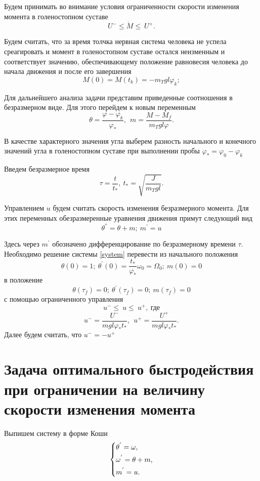 \documentclass[a4paper,14pt]{article}
\theoremstyle{plain} %
\theoremstyle{definition} %
\theoremstyle{remark} %
\begin{document}
{Будем принимать во внимание условия ограниченности скорости изменения
момента в голеностопном суставе
\[
    U^-\le\dot{M}\le\ U^+.
\]

Будем считать, что за время толчка нервная система человека
не успела среагировать и момент в голеностопном суставе остался
неизменным и соответствует значению, обеспечивающему положение
равновесия человека до начала движения и после его завершения
\[
    M(0)=M\left(t_k\right)=-m_Tgl\varphi_k;
\]

Для дальнейшего анализа задачи представим приведенные
соотношения в безразмерном виде. Для этого перейдем
к новым переменным
\[
    \theta=\frac{\varphi-\varphi_k}{\varphi_\ast},\ \ m=\frac{M-M_f}{m_Tgl\varphi}.
\]

В качестве характерного значения угла выберем разность
начального и конечного значений угла в голеностопном
суставе при выполнении пробы $\varphi_\ast=\varphi_0-\varphi_k$

Введем безразмерное время
\[
    \tau=\frac{t}{t_\ast},\ t_\ast=\sqrt{\frac{J}{m_Tgl}}.
\]

Управлением $u$ будем считать скорость изменения безразмерного
момента. Для этих переменных обезразмеренные уравнения движения
примут следующий вид
\begin{equation}\label{system}
    \theta^{''}=\theta+m;\ m^{'}=u
\end{equation}

Здесь через $m^{'}$ обозначено дифференцирование по
безразмерному времени $\tau$. Необходимо решение системы \eqref{system}
перевести из начального положения
\[
    \theta(0)=1;\ \theta^{'}(0)=\frac{t_\ast}{\varphi_\ast}\omega_0=\Omega_0;\ m(0)=0
\]
в положение
\[
    \theta(\tau_f)=0;\ \theta^{'}(\tau_f)=0;\ m(\tau_f)=0
\]
с помощью ограниченного управления
\[
    u^-\le\ u\le\ u^+,\ \text{где}
\]
\[
    u^-=\frac{U^-}{mgl\varphi_\ast t_\ast},\ \ u^+=\frac{U^+}{mgl\varphi_\ast t_\ast}.
\]
Далее будем считать, что $u^-=-u^+$
\newpage
\section{Задача оптимального быстродействия при ограничении на величину скорости изменения момента}
Выпишем систему в форме Коши
\begin{equation}\label{koshisystem}
    \left\{ {\begin{aligned}
                 & \theta^{'} = \omega , \hfill   \\
                 & \omega^{'} = \theta+m , \hfill \\
                 & m^{'} = u . \hfill             \\
            \end{aligned}} \right.
\end{equation}

}
\end{document}
